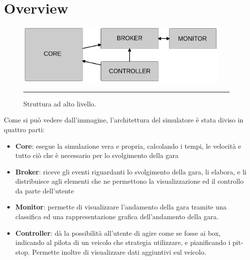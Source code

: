 \chapter{Overview} %

\label{Chapter3} %


\begin{figure}[htbp]
	\centering
		\includegraphics[keepaspectratio = true, width = 400px] {Pictures/nodes}
		\rule{35em}{0.5pt}
	\caption[Struttura]{Struttura ad alto livello.}
	\label{fig:Struttura}
\end{figure}

Come si può vedere dall’immagine, l’architettura del simulatore è stata diviso in quattro parti:
\begin{itemize}
 \item \textbf{Core}: esegue la simulazione vera e propria, calcolando i tempi, le velocità e tutto ciò che è necessario per lo svolgimento della gara
 \item \textbf{Broker}: riceve gli eventi riguardanti lo svolgimento della gara, li elabora, e li distribuisce agli elementi che ne permettono la visualizzazione ed il controllo da parte dell’utente
 \item \textbf{Monitor}: permette di visualizzare l’andamento della gara tramite una classifica ed una rappresentazione grafica dell’andamento della gara.
 \item \textbf{Controller}: dà la possibilità all’utente di agire come se fosse ai box, indicando al pilota di un veicolo che strategia utilizzare, e pianificando i pit-stop. Permette inoltre di visualizzare dati aggiuntivi sul veicolo.
\end{itemize}